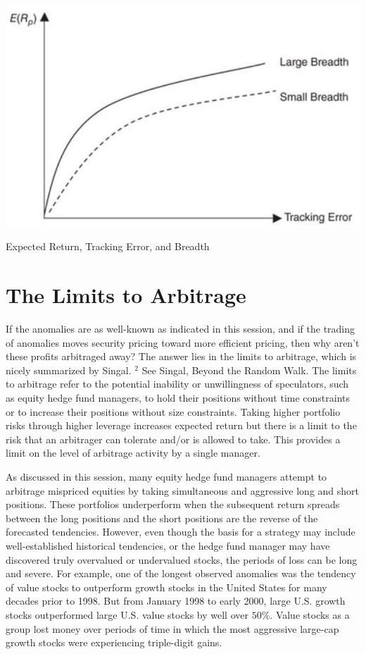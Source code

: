 \documentclass[11pt]{article}
\begin{document}
\begin{center}
\includegraphics[max width=\textwidth]{2024_04_09_a4726897464687359564g-3}
\end{center}

Expected Return, Tracking Error, and Breadth

\section*{The Limits to Arbitrage}
If the anomalies are as well-known as indicated in this session, and if the trading of anomalies moves security pricing toward more efficient pricing, then why aren't these profits arbitraged away? The answer lies in the limits to arbitrage, which is nicely summarized by Singal. ${ }^{2}$ See Singal, Beyond the Random Walk. The limits to arbitrage refer to the potential inability or unwillingness of speculators, such as equity hedge fund managers, to hold their positions without time constraints or to increase their positions without size constraints. Taking higher portfolio risks through higher leverage increases expected return but there is a limit to the risk that an arbitrager can tolerate and/or is allowed to take. This provides a limit on the level of arbitrage activity by a single manager.

As discussed in this session, many equity hedge fund managers attempt to arbitrage mispriced equities by taking simultaneous and aggressive long and short positions. These portfolios underperform when the subsequent return spreads between the long positions and the short positions are the reverse of the forecasted tendencies. However, even though the basis for a strategy may include well-established historical tendencies, or the hedge fund manager may have discovered truly overvalued or undervalued stocks, the periods of loss can be long and severe. For example, one of the longest observed anomalies was the tendency of value stocks to outperform growth stocks in the United States for many decades prior to 1998. But from January 1998 to early 2000, large U.S. growth stocks outperformed large U.S. value stocks by well over $50 \%$. Value stocks as a group lost money over periods of time in which the most aggressive large-cap growth stocks were experiencing triple-digit gains.
\end{document}

